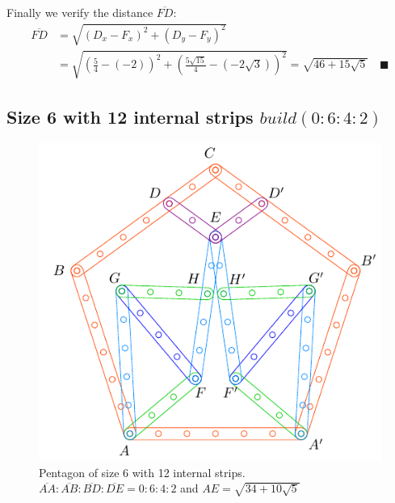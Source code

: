\documentclass[11pt]{article}
\begin{document}
Finally we verify the distance $\overline{FD}$:
\begin{align}
\overline{FD} &= \sqrt{(D_x - F_x)^2 + (D_y - F_y)^2} \nonumber\\
 &= \sqrt{ \left( \frac{5}4 -(-2) \right)^2 
  + \left( \frac{5\sqrt{15}}4 -(-2\sqrt{3}) \right)^2}
 = \sqrt{46 + 15\sqrt{5}} \quad \blacksquare
\end{align}

\subsection{Size 6 with 12 internal strips $build(0:6:4:2)$}

\begin{figure}[H]
\centering
\includegraphics[scale=1]{6/penta6-12a}
\caption{Pentagon of size 6 with 12 internal strips. $\overline{AA}:\overline{AB}:\overline{BD}:\overline{DE} = 0:6:4:2$ and $AE = \sqrt{34 + 10\sqrt5}$} 
\label{fig:penta6-12a}
\end{figure}
\end{document}
